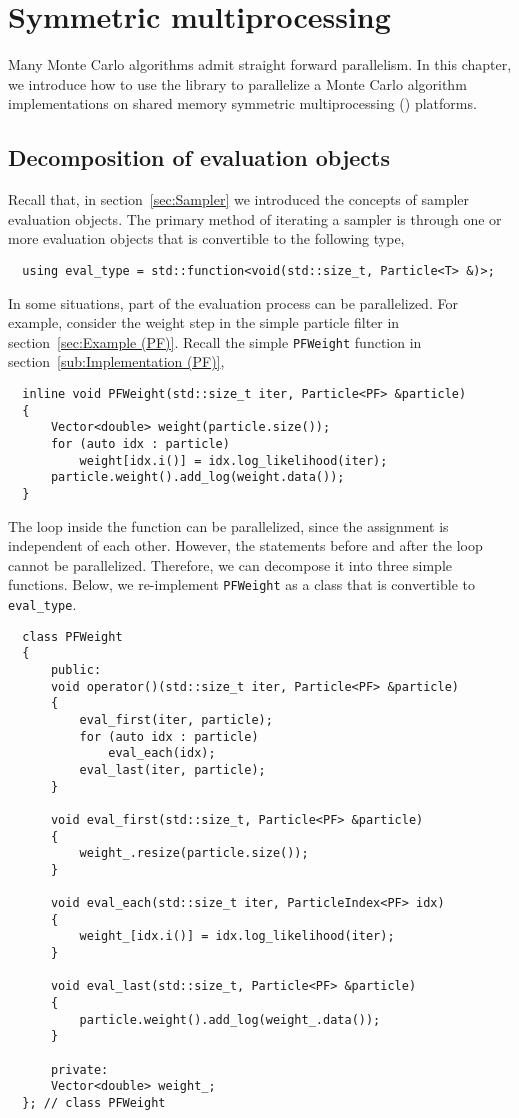 \chapter{Symmetric multiprocessing}
\label{chap:Symmetric multiprocessing}

Many Monte Carlo algorithms admit straight forward parallelism. In this
chapter, we introduce how to use the library to parallelize a Monte Carlo
algorithm implementations on shared memory symmetric multiprocessing (\smp)
platforms.

\section{Decomposition of evaluation objects}
\label{sec:Decomposition of evaluation objects}

Recall that, in section~\ref{sec:Sampler} we introduced the concepts of sampler
evaluation objects. The primary method of iterating a sampler is through
one or more evaluation objects that is convertible to the following type,
\begin{Verbatim}
  using eval_type = std::function<void(std::size_t, Particle<T> &)>;
\end{Verbatim}
In some situations, part of the evaluation process can be parallelized. For
example, consider the weight step in the simple particle filter in
section~\ref{sec:Example (PF)}. Recall the simple \verb|PFWeight| function in
section~\ref{sub:Implementation (PF)},
\begin{Verbatim}
  inline void PFWeight(std::size_t iter, Particle<PF> &particle)
  {
      Vector<double> weight(particle.size());
      for (auto idx : particle)
          weight[idx.i()] = idx.log_likelihood(iter);
      particle.weight().add_log(weight.data());
  }
\end{Verbatim}
The loop inside the function can be parallelized, since the assignment is
independent of each other. However, the statements before and after the loop
cannot be parallelized. Therefore, we can decompose it into three simple
functions. Below, we re-implement \verb|PFWeight| as a class that is
convertible to \verb|eval_type|.
\begin{Verbatim}
  class PFWeight
  {
      public:
      void operator()(std::size_t iter, Particle<PF> &particle)
      {
          eval_first(iter, particle);
          for (auto idx : particle)
              eval_each(idx);
          eval_last(iter, particle);
      }

      void eval_first(std::size_t, Particle<PF> &particle)
      {
          weight_.resize(particle.size());
      }

      void eval_each(std::size_t iter, ParticleIndex<PF> idx)
      {
          weight_[idx.i()] = idx.log_likelihood(iter);
      }

      void eval_last(std::size_t, Particle<PF> &particle)
      {
          particle.weight().add_log(weight_.data());
      }

      private:
      Vector<double> weight_;
  }; // class PFWeight
\end{Verbatim}
